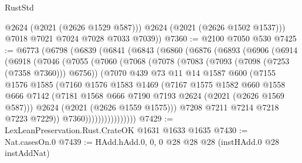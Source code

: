 \begin{lexlean}{RustStd}
\begin{coremodule}
{\begin{coremodule}
{{{{{{{{{{{{{{{{            @2624
            (@2021 (@2626 @1529 @587)))
          @2624
          (@2021 (@2626 @1502 @1537)))
        @7018
        @7021
        @7024
        @7028
        @7033
        @7039))
@7360 := @2100 @7050 @530
@7425 := @6773
    (@6798
      (@6839
        (@6841
          (@6843
            (@6860
              (@6876
                (@6893
                  (@6906
                    (@6914
                      (@6918
                        (@7046
                          (@7055
                            (@7060
                              (@7068
                                (@7078
                                  (@7083 (@7093 (@7098 (@7253 (@7358 @7360))) @6756))
                                  (@7070
                                    @439
                                    @73
                                    @11
                                    @14
                                    @1587
                                    @600
                                    (@7155
                                      @1576
                                      @1585
                                      (@7160
                                        @1576
                                        @1583
                                        @1469
                                        (@7167
                                          @1575
                                          @1582
                                          @660
                                          @1558
                                          @666
                                          @7142
                                          (@7181
                                            @1568
                                            @666
                                            @7190
                                            @7193
                                            @2624
                                            (@2021 (@2626 @1569 @587)))
                                          @2624
                                          (@2021 (@2626 @1559 @1575)))
                                        @7208
                                        @7211
                                        @7214
                                        @7218
                                        @7223
                                        @7229))
                                    @7360))))))))))))))))
@7429 := LexLeanPreservation.Rust.CrateOK @1631 @1633 @1635
@7430 := Nat.casesOn.{0}
@7439 := HAdd.hAdd.{0, 0, 0} @28 @28 @28 (instHAdd.{0} @28 instAddNat)
}}}}}}}}}}}}}}}}
\end{coremodule}}
\end{coremodule}
\end{lexlean}
